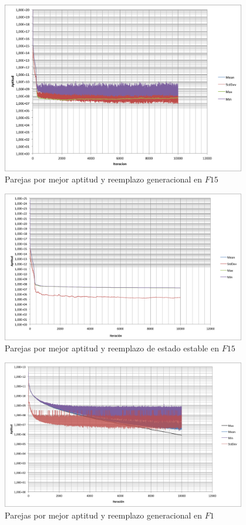 \documentclass{llncs}
\begin{document}
\begin{figure}
  \centering
    \includegraphics[width=0.95\textwidth]{F15Gen}
  \caption{Parejas por mejor aptitud  y reemplazo generacional en $F15$}
  \label{Ejecucion_5}
\end{figure}


\begin{figure}
  \centering
    \includegraphics[width=0.95\textwidth]{F15Steady}
  \caption{Parejas por mejor aptitud  y reemplazo de estado estable en $F15$}
  \label{Ejecucion_6}
\end{figure}

\begin{figure}
  \centering
    \includegraphics[width=0.95\textwidth]{bestFitGen}
  \caption{Parejas por mejor aptitud  y reemplazo generacional en $F1$}
  \label{Ejecucion_1}
\end{figure}
\end{document}
